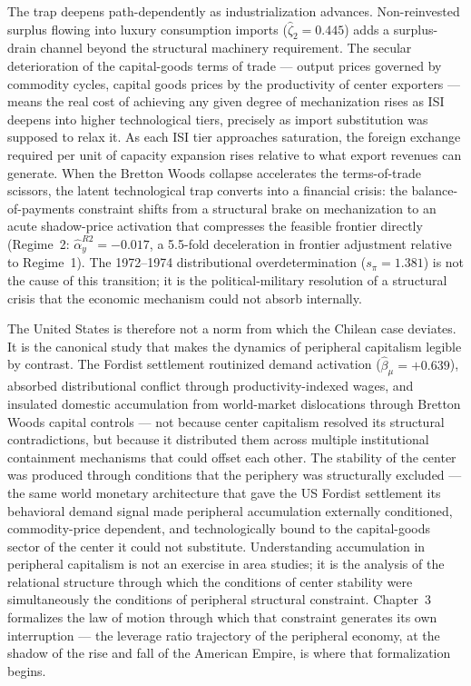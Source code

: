 \documentclass[11pt,a4paper]{article}
\begin{document}
{The trap deepens path-dependently as industrialization advances.
Non-reinvested surplus flowing into luxury consumption imports
($\hat{\zeta}_2 = 0.445$) adds a surplus-drain channel beyond
the structural machinery requirement. The secular deterioration
of the capital-goods terms of trade --- output prices governed
by commodity cycles, capital goods prices by the productivity
of center exporters --- means the real cost of achieving any
given degree of mechanization rises as ISI deepens into higher
technological tiers, precisely as import substitution was
supposed to relax it. As each ISI tier approaches saturation,
the foreign exchange required per unit of capacity expansion
rises relative to what export revenues can generate. When the
Bretton Woods collapse accelerates the terms-of-trade scissors,
the latent technological trap converts into a financial crisis:
the balance-of-payments constraint shifts from a structural
brake on mechanization to an acute shadow-price activation that
compresses the feasible frontier directly (Regime~2:
$\hat{\alpha}_y^{R2} = -0.017$, a 5.5-fold deceleration in
frontier adjustment relative to Regime~1). The 1972--1974
distributional overdetermination ($s_\pi = 1.381$) is not the
cause of this transition; it is the political-military resolution
of a structural crisis that the economic mechanism could not
absorb internally.

The United States is therefore not a norm from which the Chilean
case deviates. It is the canonical study that makes the dynamics
of peripheral capitalism legible by contrast. The Fordist
settlement routinized demand activation ($\hat{\beta}_\mu =
+0.639$), absorbed distributional conflict through
productivity-indexed wages, and insulated domestic accumulation
from world-market dislocations through Bretton Woods capital
controls --- not because center capitalism resolved its structural
contradictions, but because it distributed them across multiple
institutional containment mechanisms that could offset each other.
The stability of the center was produced through conditions that
the periphery was structurally excluded --- the same world monetary
architecture that gave the US Fordist settlement its behavioral
demand signal made peripheral accumulation externally conditioned,
commodity-price dependent, and technologically bound to the
capital-goods sector of the center it could not substitute.
Understanding accumulation in peripheral capitalism is not an
exercise in area studies; it is the analysis of the relational
structure through which the conditions of center stability were
simultaneously the conditions of peripheral structural constraint.
Chapter~3 formalizes the law of motion through which that
constraint generates its own interruption --- the leverage ratio
trajectory of the peripheral economy, at the shadow of the rise
and fall of the American Empire, is where that formalization
begins.

}
\end{document}
